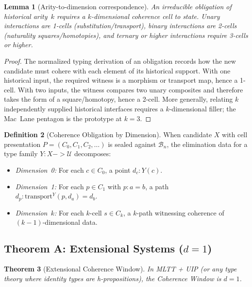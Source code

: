 \documentclass[11pt,a4paper]{article}
\def\to{->}%
\theoremstyle{plain}
\newtheorem{theorem}{Theorem}[section]
\newtheorem{lemma}[theorem]{Lemma}
\theoremstyle{definition}
\newtheorem{definition}[theorem]{Definition}
\theoremstyle{remark}
\newcommand{\U}{\mathcal{U}}
\begin{document}
\begin{lemma}[Arity-to-dimension correspondence]
\label{lem:arity-dimension}
An irreducible obligation of historical arity~$k$ requires a $k$-dimensional coherence cell to state.
Unary interactions are 1-cells (substitution/transport), binary interactions are 2-cells (naturality squares/homotopies), and ternary or higher interactions require 3-cells or higher.
\end{lemma}

\begin{proof}
The normalized typing derivation of an obligation records how the new candidate must cohere with each element of its historical support.
With one historical input, the required witness is a morphism or transport map, hence a 1-cell.
With two inputs, the witness compares two unary composites and therefore takes the form of a square/homotopy, hence a 2-cell.
More generally, relating $k$ independently supplied historical interfaces requires a $k$-dimensional filler; the Mac~Lane pentagon is the prototype at $k = 3$.
\end{proof}

\begin{definition}[Coherence Obligation by Dimension]
\label{def:dim-obligation}
When candidate $X$ with cell presentation $P = (C_0, C_1, C_2, \ldots)$ is sealed against $\mathcal{B}_n$, the elimination data for a type family $Y : X \to \U$ decomposes:
\begin{itemize}[nosep]
    \item \emph{Dimension~0:} For each $c \in C_0$, a point $d_c : Y(c)$.
    \item \emph{Dimension~1:} For each $p \in C_1$ with $p : a = b$, a path $d_p : \mathrm{transport}^Y(p, d_a) = d_b$.
    \item \emph{Dimension~$k$:} For each $k$-cell $s \in C_k$, a $k$-path witnessing coherence of $(k{-}1)$-dimensional data.
\end{itemize}
\end{definition}

\subsection{\texorpdfstring{Theorem A: Extensional Systems ($d = 1$)}{Theorem A: Extensional Systems (d = 1)}}

\begin{theorem}[Extensional Coherence Window]
\label{thm:ext-window}
In MLTT + UIP (or any type theory where identity types are h-propositions), the Coherence Window is $d = 1$.
\end{theorem}
\end{document}

